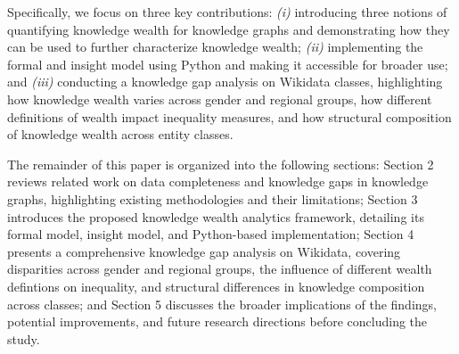 Specifically, we focus on three key contributions: \textit{(i)} introducing three notions of quantifying knowledge wealth for knowledge graphs and demonstrating how they can be used to further characterize knowledge wealth; \textit{(ii)} implementing the formal and insight model using Python and making it accessible for broader use; and \textit{(iii)} conducting a knowledge gap analysis on Wikidata classes, highlighting how knowledge wealth varies across gender and regional groups, how different definitions of wealth impact inequality measures, and how structural composition of knowledge wealth across entity classes.

The remainder of this paper is organized into the following sections: Section 2 reviews related work on data completeness and knowledge gaps in knowledge graphs, highlighting existing methodologies and their limitations; Section 3 introduces the proposed knowledge wealth analytics framework, detailing its formal model, insight model, and Python-based implementation; Section 4 presents a comprehensive knowledge gap analysis on Wikidata, covering disparities across gender and regional groups, the influence of different wealth defintions on inequality, and structural differences in knowledge composition across classes; and Section 5 discusses the broader implications of the findings, potential improvements, and future research directions before concluding the study.